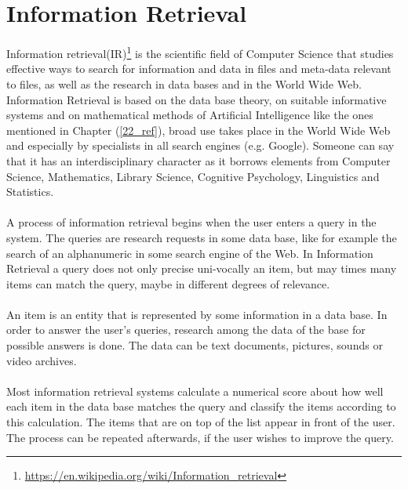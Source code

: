 \section{Information Retrieval}\label{23_ref}
Information retrieval(IR)\footnote{\url{https://en.wikipedia.org/wiki/Information_retrieval}} is the scientific field of Computer Science that studies effective ways to search for information and data in files and meta-data relevant to files, as well as the research in data bases and in the World Wide Web. Information Retrieval is based on the data base theory, on suitable informative systems and on mathematical methods of Artificial Intelligence like the ones mentioned in Chapter (\ref{22_ref}), broad use takes place in the World Wide Web and especially by specialists in all search engines (e.g. Google). Someone can say that it has an interdisciplinary character as it borrows elements from Computer Science, Mathematics, Library Science, Cognitive Psychology, Linguistics and Statistics.\\
\\
A process of information retrieval begins when the user enters a query in the system. The queries are research requests in some data base, like for example the search of an alphanumeric in some search engine of the Web. In Information Retrieval a query does not only precise uni-vocally an item, but may times many items can match the query, maybe in different degrees of relevance.\\
\\
An item is an entity that is represented by some information in a data base. In order to answer the user's queries, research among the data of the base for possible answers is done. The data can be text documents, pictures, sounds or video archives.\\
\\
Most information retrieval systems calculate a numerical score about how well each item in the data base matches the query and classify the items according to this calculation. The items that are on top of the list appear in front of the user. The process can be repeated afterwards, if the user wishes to improve the query.

